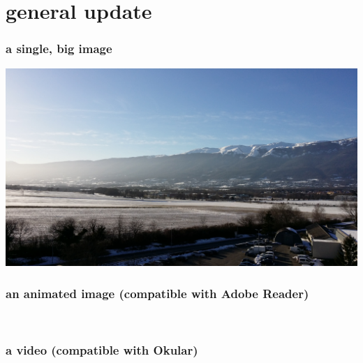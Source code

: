 \section{general update}

\begin{frame}
\frametitle{a single, big image}
\vspace{-0.24 cm}
\begin{center}
\includegraphics[width=\measureUSpecification]{images/2015-02-09T161202.jpg}\\
\end{center}
\end{frame}

\begin{frame}
\frametitle{an animated image (compatible with Adobe Reader)}
\vspace{-0.24 cm}
\begin{center}
\\
\end{center}
\end{frame}

\begin{frame}
\frametitle{a video (compatible with Okular)}
\vspace{-0.24 cm}
\begin{center}
\end{center}
\end{frame}

